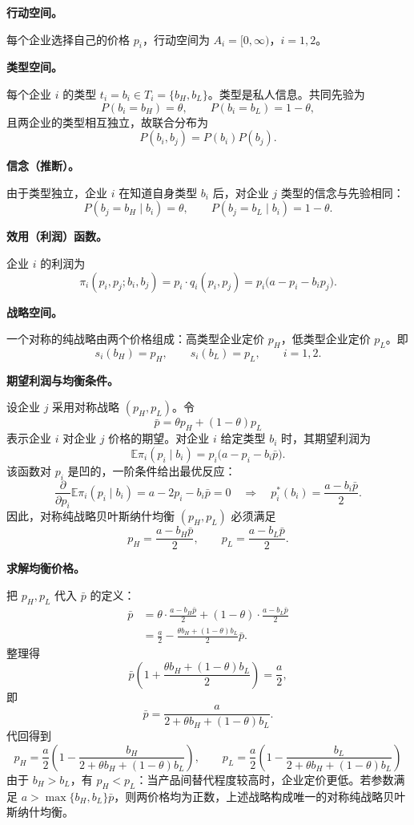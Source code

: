 \sol

\textbf{行动空间。}

每个企业选择自己的价格 $p_i$，行动空间为 $A_i=[0,\infty)$，$i=1,2$。

\textbf{类型空间。}

每个企业 $i$ 的类型 $t_i=b_i\in T_i=\{b_H,b_L\}$。类型是私人信息。共同先验为
\[
	P(b_i=b_H)=\theta,\qquad P(b_i=b_L)=1-\theta,
\]\indent
且两企业的类型相互独立，故联合分布为
\[
	P(b_i,b_j)=P(b_i)P(b_j).
\]

\textbf{信念（推断）。}

由于类型独立，企业 $i$ 在知道自身类型 $b_i$ 后，对企业 $j$ 类型的信念与先验相同：
\[
	P(b_j=b_H\mid b_i)=\theta,\qquad P(b_j=b_L\mid b_i)=1-\theta.
\]

\textbf{效用（利润）函数。}

企业 $i$ 的利润为
\[
	\pi_i(p_i,p_j;b_i,b_j)=p_i\cdot q_i(p_i,p_j)=p_i\bigl(a-p_i-b_i p_j\bigr).
\]

\textbf{战略空间。}

一个对称的纯战略由两个价格组成：高类型企业定价 $p_H$，低类型企业定价 $p_L$。即
\[
	s_i(b_H)=p_H,\qquad s_i(b_L)=p_L,\qquad i=1,2.
\]

\textbf{期望利润与均衡条件。}

设企业 $j$ 采用对称战略 $(p_H,p_L)$。令
\[
	\bar p=\theta p_H+(1-\theta)p_L
\]\indent
表示企业 $i$ 对企业 $j$ 价格的期望。对企业 $i$ 给定类型 $b_i$ 时，其期望利润为
\[
	\mathbb{E}\pi_i(p_i\mid b_i)
	=p_i\bigl(a-p_i-b_i\bar p\bigr).
\]\indent
该函数对 $p_i$ 是凹的，一阶条件给出最优反应：
\[
	\frac{\partial}{\partial p_i}\mathbb{E}\pi_i(p_i\mid b_i)=a-2p_i-b_i\bar p=0
	\quad\Longrightarrow\quad
	p_i^*(b_i)=\frac{a-b_i\bar p}{2}.
\]\indent
因此，对称纯战略贝叶斯纳什均衡 $(p_H,p_L)$ 必须满足
\[
	p_H=\frac{a-b_H\bar p}{2},\qquad p_L=\frac{a-b_L\bar p}{2}.
\]

\textbf{求解均衡价格。}

把 $p_H,p_L$ 代入 $\bar p$ 的定义：
\[
\begin{aligned}
	\bar p
	&=\theta\cdot\frac{a-b_H\bar p}{2}+(1-\theta)\cdot\frac{a-b_L\bar p}{2}\\[4pt]
	&=\frac{a}{2}-\frac{\theta b_H+(1-\theta)b_L}{2}\bar p.
\end{aligned}
\]\indent
整理得
\[
	\bar p\left(1+\frac{\theta b_H+(1-\theta)b_L}{2}\right)=\frac{a}{2},
\]\indent
即
\[
	\bar p=\frac{a}{2+\theta b_H+(1-\theta)b_L}.
\]\indent
代回得到
\[
	\boxed{
	p_H=\frac{a}{2}\left(1-\frac{b_H}{2+\theta b_H+(1-\theta)b_L}\right),
	\qquad
	p_L=\frac{a}{2}\left(1-\frac{b_L}{2+\theta b_H+(1-\theta)b_L}\right)
	}
\]\indent
由于 $b_H>b_L$，有 $p_H<p_L$：当产品间替代程度较高时，企业定价更低。若参数满足 $a>\max\{b_H,b_L\}\bar p$，则两价格均为正数，上述战略构成唯一的对称纯战略贝叶斯纳什均衡。


